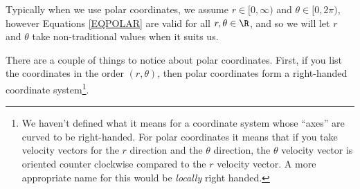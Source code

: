Typically when we use polar coordinates, we assume $r\in[0,\infty)$ and $\theta\in[0,2\pi)$, however
Equations \eqref{EQPOLAR} are valid for all $r,\theta\in\R$, and so we will let
$r$ and $\theta$ take non-traditional values when it suits us.

There are a couple of things to notice about polar coordinates.  First, if you list
the coordinates in the order $(r,\theta)$, then polar coordinates form a right-handed
coordinate system\footnote{ We haven't defined what it means for a coordinate system
whose ``axes'' are curved to be right-handed.  For polar coordinates it means that if
you take velocity vectors for the $r$ direction and the $\theta$ direction, the $\theta$
velocity vector is oriented counter clockwise compared to the $r$ velocity vector.  A more
appropriate name for this would be \emph{locally} right handed.}. 

